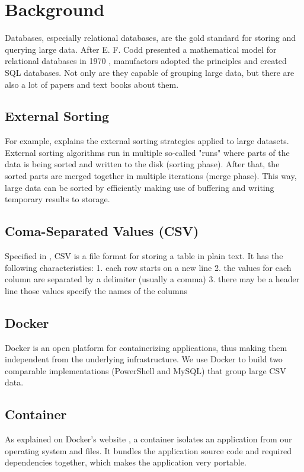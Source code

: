 \documentclass[12pt,letterpaper]{article} %
\begin{document}
\section{Background} \label{Background}

Databases, especially relational databases, are the gold standard for
storing and querying large data. After E. F. Codd presented a mathematical
model for relational databases in 1970 \cite{Codd70}, manufactors
adopted the principles and created SQL databases. Not only are
they capable of grouping large data, but there are also a lot of papers
and text books about them.

\subsection{External Sorting}
For example, \cite{Elma89} explains the external sorting strategies
applied to large datasets. External sorting algorithms run in
multiple so-called "runs" where parts of the data is being sorted
and written to the disk (sorting phase). After that,
the sorted parts are merged together in multiple iterations
(merge phase). This way, large data can be sorted by efficiently
making use of buffering and writing temporary results to storage.

\subsection{Coma-Separated Values (CSV)}
Specified in \cite{rfc4180}, CSV is a file format for storing a table in plain text. It has
the following characteristics:
1. each row starts on a new line
2. the values for each column are separated by a delimiter (usually a comma)
3. there may be a header line those values specify the names of the columns

\subsection{Docker}
Docker is an open platform for containerizing applications, thus making them independent
from the underlying infrastructure. We use Docker to build two comparable implementations
(PowerShell and MySQL) that group large CSV data.

\subsection{Container}
As explained on Docker's website \cite{docContainer}, a container isolates an application
from our operating system and files. It bundles the application source
code and required dependencies together, which makes the application very
portable.
\end{document}
